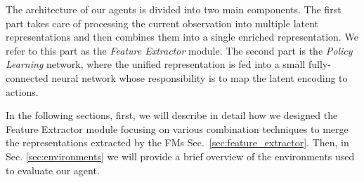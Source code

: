 The architecture of our agents is divided into two main components.
The first part takes care of processing the current observation into multiple latent representations and then combines them into a single enriched representation.
We refer to this part as the \textit{Feature Extractor} module.
The second part is the \textit{Policy Learning} network, where the unified representation is fed into a small fully-connected neural network whose responsibility is to map the latent encoding to actions.


In the following sections, first, we will describe in detail how we designed the Feature Extractor module focusing on various combination techniques to merge the representations extracted by the FMs  Sec.~\ref{sec:feature_extractor}.
Then, in Sec. \ref{sec:environments} we will provide a brief overview of the environments used to evaluate our agent.












